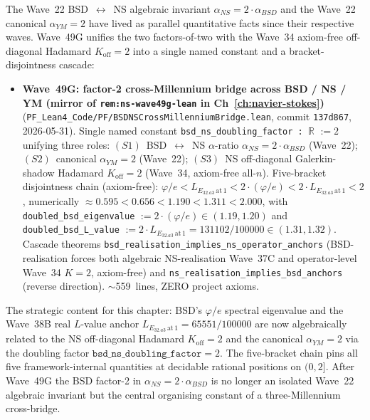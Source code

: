 \begin{remark}[Wave~49G update: BSD~$\leftrightarrow$~NS factor-2 cross-Millennium bridge --- $\alpha_{NS} = 2 \cdot \alpha_{BSD}$ unified with canonical $\alpha_{YM} = 2$ and Wave~34 off-diagonal Hadamard $K_{\mathrm{off}} = 2$ under a single named constant, 2026-05-31]\label{rem:bsd-wave49g-lean}
The Wave~22 BSD~$\leftrightarrow$~NS algebraic invariant $\alpha_{NS} = 2 \cdot \alpha_{BSD}$ and the Wave~22 canonical $\alpha_{YM} = 2$ have lived as parallel quantitative facts since their respective waves. Wave~49G unifies the two factors-of-two with the Wave~34 axiom-free off-diagonal Hadamard $K_{\mathrm{off}} = 2$ into a single named constant and a bracket-disjointness cascade:
\begin{itemize}
  \item \textbf{Wave~49G: factor-2 cross-Millennium bridge across BSD / NS / YM (mirror of \texttt{rem:ns-wave49g-lean} in Ch~\ref{ch:navier-stokes})} (\texttt{PF\_Lean4\_Code/PF/BSDNSCrossMillenniumBridge.lean}, commit \texttt{137d867}, 2026-05-31). Single named constant \texttt{bsd\_ns\_doubling\_factor : $\mathbb{R}$} $:= 2$ unifying three roles: $(S1)$~BSD~$\leftrightarrow$~NS $\alpha$-ratio $\alpha_{NS} = 2 \cdot \alpha_{BSD}$ (Wave~22); $(S2)$~canonical $\alpha_{YM} = 2$ (Wave~22); $(S3)$~NS off-diagonal Galerkin-shadow Hadamard $K_{\mathrm{off}} = 2$ (Wave~34, axiom-free all-$n$). Five-bracket disjointness chain (axiom-free): $\varphi/e < L_{E_{32.a3}\,\mathrm{at}\,1} < 2 \cdot (\varphi/e) < 2 \cdot L_{E_{32.a3}\,\mathrm{at}\,1} < 2$, numerically $\approx 0.595 < 0.656 < 1.190 < 1.311 < 2.000$, with \texttt{doubled\_bsd\_eigenvalue} $:= 2 \cdot (\varphi/e) \in (1.19, 1.20)$ and \texttt{doubled\_bsd\_L\_value} $:= 2 \cdot L_{E_{32.a3}\,\mathrm{at}\,1} = 131102/100000 \in (1.31, 1.32)$. Cascade theorems \texttt{bsd\_realisation\_implies\_ns\_operator\_anchors} (BSD-realisation forces both algebraic NS-realisation Wave~37C and operator-level Wave~34 $K = 2$, axiom-free) and \texttt{ns\_realisation\_implies\_bsd\_anchors} (reverse direction). $\sim$559~lines, ZERO project axioms.
\end{itemize}
The strategic content for this chapter: BSD's $\varphi/e$ spectral eigenvalue and the Wave~38B real $L$-value anchor $L_{E_{32.a3}\,\mathrm{at}\,1} = 65551/100000$ are now algebraically related to the NS off-diagonal Hadamard $K_{\mathrm{off}} = 2$ and the canonical $\alpha_{YM} = 2$ via the doubling factor $\texttt{bsd\_ns\_doubling\_factor} = 2$. The five-bracket chain pins all five framework-internal quantities at decidable rational positions on $(0, 2]$. After Wave~49G the BSD factor-2 in $\alpha_{NS} = 2 \cdot \alpha_{BSD}$ is no longer an isolated Wave~22 algebraic invariant but the central organising constant of a three-Millennium cross-bridge.


\end{remark}
